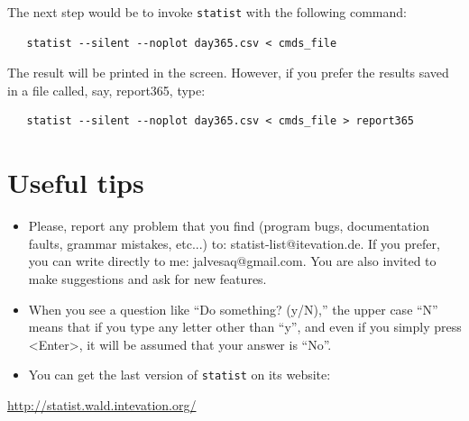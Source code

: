 \documentclass[12pt,english]{article}
\newcommand{\st}{{\tt sta\-tist} }
\begin{document}
The next step would be to invoke \st with the following
command:

\begin{verbatim}
   statist --silent --noplot day365.csv < cmds_file
\end{verbatim}

The result will be printed in the screen. However, if you
prefer the results saved in a file called, say, report365,
type:

\begin{verbatim}
   statist --silent --noplot day365.csv < cmds_file > report365
\end{verbatim}

\section{Useful tips}

\begin{itemize}

\item Please, report any problem that you find (program
  bugs, documentation faults, grammar mistakes, etc...) to:
  statist-list@itevation.de. If you prefer, you can write
  directly to me: jalvesaq@gmail.com. You are also
  invited to make suggestions and ask for new features.

\item When you see a question like ``Do something? (y/N),''
  the upper case ``N'' means that if you type any letter
  other than ``y'', and even if you simply press <Enter>, it
  will be assumed that your answer is ``No''.
  
\item You can get the last version of \st on its
website:

\end{itemize}

\begin{center}
\href{http://statist.wald.intevation.org/}
{http://statist.wald.intevation.org/}
\end{center}
\end{document}
